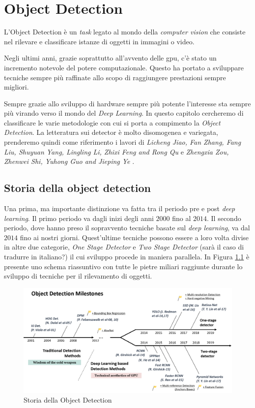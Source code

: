 \chapter{Object Detection}
L'Object Detection è un \textit{task} legato al mondo della \textit{computer vision}
che consiste nel rilevare e classificare istanze di oggetti in immagini o video.

Negli ultimi anni, grazie soprattutto all'avvento delle \ac{gpu}, c'è stato un 
incremento notevole del potere computazionale. Questo ha portato a sviluppare tecniche 
sempre più raffinate allo scopo di raggiungere prestazioni sempre migliori. 

Sempre grazie allo sviluppo di hardware sempre più potente l'interesse sta sempre 
più virando verso il mondo del \textit{Deep Learning}. 
In questo capitolo cercheremo di classificare le varie metodologie con cui si 
porta a compimento la \textit{Object Detection}. 
La letteratura sui detector è molto disomogenea e variegata, prenderemo quindi come riferimento i lavori di 
\textit{Licheng Jiao, Fan Zhang, Fang Liu, Shuyuan Yang, Lingling Li, Zhixi Feng and Rong Qu} 
\cite{DBLP:journals/corr/abs-1907-09408} e 
\textit{Zhengxia Zou, Zhenwei Shi, Yuhong Guo and Jieping Ye} \cite{DBLP:journals/corr/abs-1905-05055}.


\section{Storia della object detection}
\label{sec:history_obj}
Una prima, ma importante distinzione va fatta tra il periodo pre e post \textit{deep learning}. Il primo periodo va dagli inizi degli anni $2000$ fino al $2014$. Il secondo periodo, dove hanno preso il sopravvento tecniche basate sul \textit{deep learning}, va dal $2014$ fino ai nostri giorni. Quest'ultime tecniche possono essere a loro volta divise in altre due categorie, \textit{One Stage Detector} e \textit{Two Stage Detector} (sarà il caso di tradurre in italiano?) il cui sviluppo procede in maniera parallela. In Figura \ref{fig:history_object_detection} è presente uno schema riassuntivo con tutte le pietre miliari raggiunte durante lo sviluppo di tecniche per il rilevamento di oggetti.
\begin{figure}
    \centering
    \includegraphics[width=\textwidth]{images/mile-stones.png}
    \caption{Storia della Object Detection \cite{DBLP:journals/corr/abs-1905-05055}}
    \label{fig:history_object_detection}
\end{figure}
